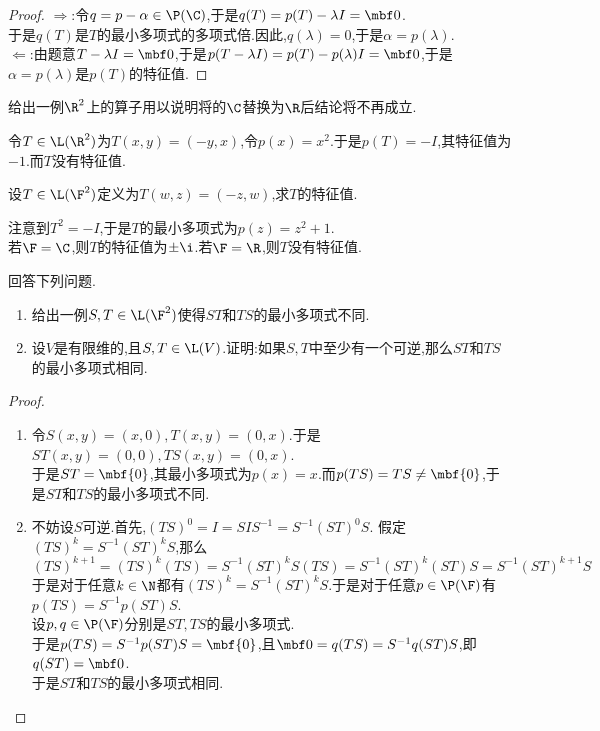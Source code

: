 \documentclass{ctexart}
\begin{document}
\begin{proof}
    $\Rightarrow$:令$q=p-\alpha\in\P(\C)$,于是$q(T)=p(T)-\lambda I=\mbf0$.\\
    于是$q(T)$是$T$的最小多项式的多项式倍.因此,$q(\lambda)=0$,于是$\alpha=p(\lambda)$.\\
    $\Leftarrow$:由题意$T-\lambda I=\mbf0$,于是$p(T-\lambda I)=p(T)-p(\lambda)I=\mbf0$,于是$\alpha=p(\lambda)$是$p(T)$的特征值.
\end{proof}
\begin{problem}[5.]
    给出一例$\R^2$上的算子用以说明将的$\C$替换为$\R$后结论将不再成立.
\end{problem}
\begin{solution}
    令$T\in\L(\R^2)$为$T(x,y)=(-y,x)$,令$p(x)=x^2$.于是$p(T)=-I$,其特征值为$-1$.而$T$没有特征值.
\end{solution}
\begin{problem}[6.]
    设$T\in\L(\F^2)$定义为$T(w,z)=(-z,w)$,求$T$的特征值.
\end{problem}
\begin{solution}
    注意到$T^2=-I$,于是$T$的最小多项式为$p(z)=z^2+1$.\\
    若$\F=\C$,则$T$的特征值为$\pm\i$.若$\F=\R$,则$T$没有特征值.
\end{solution}
\begin{problem}[7.]
    回答下列问题.
    \begin{enumerate}[label=\tbf{(\arabic*)}]
        \item 给出一例$S,T\in\L(\F^2)$使得$ST$和$TS$的最小多项式不同.
        \item 设$V$是有限维的,且$S,T\in\L(V)$.证明:如果$S,T$中至少有一个可逆,那么$ST$和$TS$的最小多项式相同.
    \end{enumerate}
\end{problem}
\begin{proof}
    \begin{enumerate}[label=\tbf{(\arabic*)}]
        \item 令$S(x,y)=(x,0),T(x,y)=(0,x)$.于是$ST(x,y)=(0,0),TS(x,y)=(0,x)$.\\
            于是$ST=\mbf{0}$,其最小多项式为$p(x)=x$.而$p(TS)=TS\neq\mbf{0}$,于是$ST$和$TS$的最小多项式不同.
        \item 不妨设$S$可逆.首先,$(TS)^0=I=SIS^{-1}=S^{-1}(ST)^0S$.
            假定$(TS)^k=S^{-1}(ST)^kS$,那么
            $$(TS)^{k+1}=(TS)^k(TS)=S^{-1}(ST)^kS(TS)=S^{-1}(ST)^k(ST)S=S^{-1}(ST)^{k+1}S$$
            于是对于任意$k\in\N$都有$(TS)^k=S^{-1}(ST)^kS$.于是对于任意$p\in\P(\F)$有$p(TS)=S^{-1}p(ST)S$.\\
            设$p,q\in\P(\F)$分别是$ST,TS$的最小多项式.\\
            于是$p(TS)=S^{-1}p(ST)S=\mbf{0}$,且$\mbf0=q(TS)=S^{-1}q(ST)S$,即$q(ST)=\mbf0$.\\
            于是$ST$和$TS$的最小多项式相同.
    \end{enumerate}
\end{proof}
\end{document}
